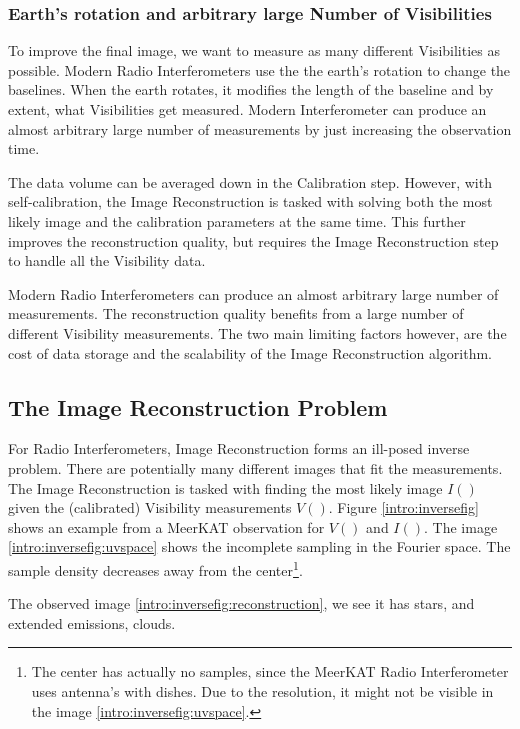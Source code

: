 \subsubsection{Earth's rotation and arbitrary large Number of Visibilities}
To improve the final image, we want to measure as many different Visibilities as possible. Modern Radio Interferometers use the the earth's rotation to change the baselines. When the earth rotates, it modifies the length of the baseline and by extent, what Visibilities get measured. Modern Interferometer can produce an almost arbitrary large number of measurements by just increasing the observation time.

The data volume can be averaged down in the Calibration step. However, with self-calibration, the Image Reconstruction is tasked with solving both the most likely image and the calibration parameters at the same time. This further improves the reconstruction quality\cite{Wiauxselfcal}, but requires the Image Reconstruction step to handle all the Visibility data.

Modern Radio Interferometers can produce an almost arbitrary large number of measurements. The reconstruction quality benefits from a large number of different Visibility measurements. The two main limiting factors however, are the cost of data storage and the scalability of the Image Reconstruction algorithm.


\subsection{The Image Reconstruction Problem}
For Radio Interferometers, Image Reconstruction forms an ill-posed inverse problem. There are potentially many different images that fit the measurements. The Image Reconstruction is tasked with finding the most likely image $I()$ given the (calibrated) Visibility measurements $V()$.  Figure \ref{intro:inversefig} shows an example from a MeerKAT observation for $V()$ and $I()$. The image \ref{intro:inversefig:uvspace} shows the incomplete sampling in the Fourier space. The sample density decreases away from the center\footnote{The center has actually no samples, since the MeerKAT Radio Interferometer uses antenna's with dishes. Due to the resolution, it might not be visible in the image \ref{intro:inversefig:uvspace}.}. 

The observed image \ref{intro:inversefig:reconstruction}, we see it has stars, and extended emissions, clouds. 

